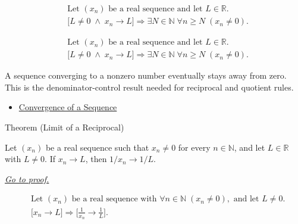 \begin{remark*}
\[
\begin{aligned}
&\text{Let } (x_n) \text{ be a real sequence and let } L\in\mathbb{R}.\\
&\bigl[
L\neq 0 \;\land\; x_n\to L
\bigr]
\Longrightarrow
\exists N\in\mathbb{N}\;\forall n\ge N\;(x_n\neq 0).
\end{aligned}
\]
\end{remark*}

\begin{remark*}
\[
\begin{aligned}
&\text{Let } (x_n) \text{ be a real sequence and let } L\in\mathbb{R}.\\
&\bigl[
L\neq 0 \;\land\; x_n\to L
\bigr]
\Longrightarrow
\exists N\in\mathbb{N}\;\forall n\ge N\;(x_n\neq 0).
\end{aligned}
\]
\end{remark*}

\begin{remark*}[Interpretation]
A sequence converging to a nonzero number eventually stays away from zero.
This is the denominator-control result needed for reciprocal and quotient
rules.
\end{remark*}

\begin{dependencies}
\begin{itemize}
  \item \hyperref[def:convergent-sequence]{Convergence of a Sequence}
\end{itemize}
\end{dependencies}


\begin{theorembox}{Theorem (Limit of a Reciprocal)}
\begin{theorem}
\label{thm:limit-of-a-reciprocal}
Let $(x_n)$ be a real sequence such that $x_n\neq 0$ for every
$n\in\mathbb{N}$, and let $L\in\mathbb{R}$ with $L\neq 0$. If $x_n\to L$,
then $1/x_n\to 1/L$.

\smallskip
\noindent
\hyperref[prf:limit-of-a-reciprocal]{\textit{Go to proof.}}
\end{theorem}
\end{theorembox}

\begin{remark*}
\[
\begin{aligned}
&\text{Let } (x_n) \text{ be a real sequence with }
  \forall n\in\mathbb{N}\;(x_n\neq 0), \text{ and let } L\neq 0.\\
&\bigl[x_n\to L\bigr]
\Longrightarrow
\bigl[\frac{1}{x_n}\to \frac{1}{L}\bigr].
\end{aligned}
\]
\end{remark*}

